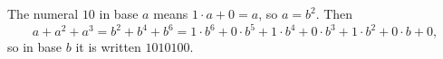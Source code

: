 The numeral $10$ in base $a$ means $1\cdot a+0=a$, so $a=b^2$. Then
\[
a+a^2+a^3=b^2+b^4+b^6=1\cdot b^6+0\cdot b^5+1\cdot b^4+0\cdot b^3+1\cdot b^2+0\cdot b+0,
\]
so in base $b$ it is written $\boxed{1010100}$.
